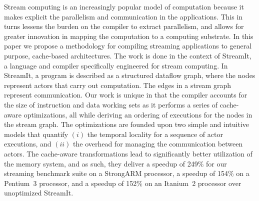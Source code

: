 
Stream computing is an increasingly popular model of computation
because it makes explicit the parallelism and communication in the
applications. This in turns lessens the burden on the compiler to
extract parallelism, and allows for greater innovation in mapping the
computation to a computing substrate. In this paper we propose a
methodology for compiling streaming applications to general purpose,
cache-based architectures. The work is done in the context of
StreamIt, a language and compiler specifically engineered for stream
computing. In StreamIt, a program is described as a structured dataflow
graph, where the nodes represent actors that carry out 
computation. The edges in a stream graph represent
communication. Our work is unique in that the compiler
accounts for the size of instruction and data working sets as it
performs a series of cache-aware optimizations, all while deriving an
ordering of executions for the nodes in the stream graph. The
optimizations are founded upon two simple and intuitive models that
quantify $(i)$ the temporal locality for a sequence of  actor
executions, and $(ii)$ the overhead for managing the communication
between actors. The cache-aware transformations lead to significantly
better utilization of the memory system, and as such, they deliver
a speedup of 249\% for our streaming benchmark suite on a StrongARM 
processor, a speedup of 154\% on a Pentium~3 processor, and a 
speedup of 152\% on an Itanium~2 processor over unoptimized StreamIt.

